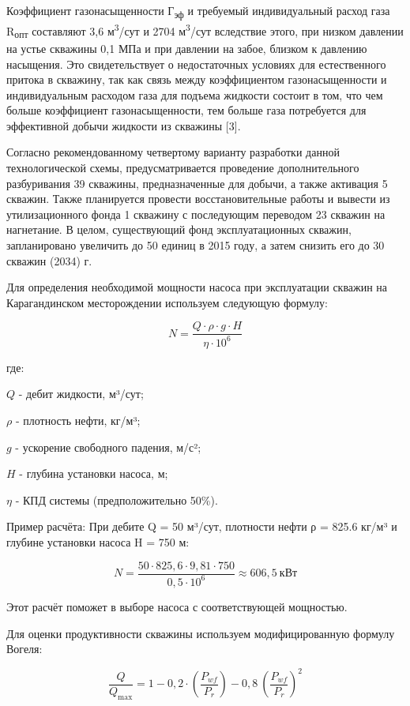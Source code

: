\begin{multicols}{2}
Коэффициент газонасыщенности Г\textsubscript{эф} и требуемый
индивидуальный расход газа R\textsubscript{опт} составляют 3,6
м\textsuperscript{3}/сут и 2704 м\textsuperscript{3}/сут вследствие
этого, при низком давлении на устье скважины 0,1 МПа и при давлении на
забое, близком к давлению насыщения. Это свидетельствует о недостаточных
условиях для естественного притока в скважину, так как связь между
коэффициентом газонасыщенности и индивидуальным расходом газа для
подъема жидкости состоит в том, что чем больше коэффициент
газонасыщенности, тем больше газа потребуется для эффективной добычи
жидкости из скважины {[}3{]}.

Согласно рекомендованному четвертому варианту разработки данной
технологической схемы, предусматривается проведение дополнительного
разбуривания 39 скважины, предназначенные для добычи, а также активация
5 скважин. Также планируется провести восстановительные работы и вывести
из утилизационного фонда 1 скважину с последующим переводом 23 скважин
на нагнетание. В целом, существующий фонд эксплуатационных скважин,
запланировано увеличить до 50 единиц в 2015 году, а затем снизить его до
30 скважин (2034) г.

Для определения необходимой мощности насоса при эксплуатации скважин
на Карагандинском месторождении используем следующую формулу:

\begin{equation}
N = \frac{Q \cdot \rho \cdot g \cdot H}{\eta \cdot 10^{6}}
\end{equation}

где:

$Q$ - дебит жидкости, м³/сут;

$\rho$ - плотность нефти, кг/м³;

$g$ - ускорение свободного падения, м/с²;

$H$ - глубина установки насоса, м;

$\eta$ - КПД системы (предположительно 50\%).

Пример расчёта: При дебите Q = 50 м³/сут, плотности нефти ρ = 825.6 кг/м³ и глубине установки насоса H = 750 м:

\[N = \frac{50 \cdot 825,6 \cdot 9,81 \cdot 750}{0,5 \cdot 10^{6}} \approx 606,5\ \text{кВт}\]

Этот расчёт поможет в выборе насоса с соответствующей мощностью.

Для оценки продуктивности скважины используем модифицированную формулу
Вогеля:

\begin{equation}
\frac{Q}{Q_{\max}} = 1 - 0,2 \cdot \left( \frac{P_{wf}}{P_{r}} \right) - 0,8\ \left( \frac{P_{wf}}{P_{r}} \right)^{2}
\end{equation}


\end{multicols}
